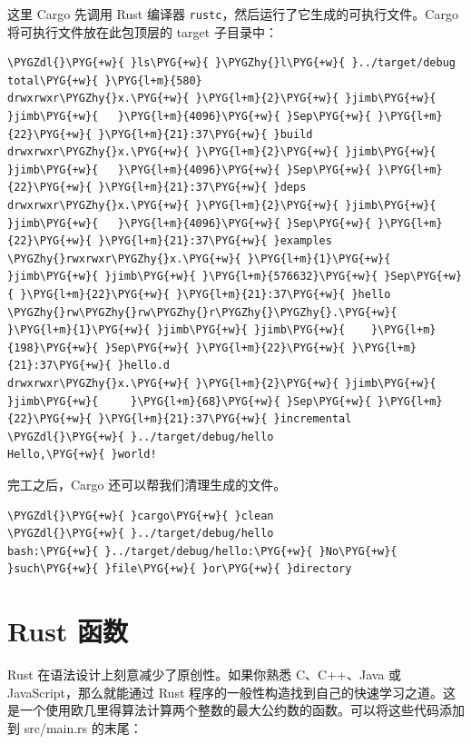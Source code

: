 这里 Cargo 先调用 Rust 编译器 \texttt{rustc}，然后运行了它生成的可执行文件。Cargo 将可执行文件放在此包顶层的 target 子目录中：

\begin{Verbatim}[commandchars=\\\{\},breaklines=true,breakanywhere=true,fontsize=\codefont,xleftmargin=17bp]
\PYGZdl{}\PYG{+w}{ }ls\PYG{+w}{ }\PYGZhy{}l\PYG{+w}{ }../target/debug
total\PYG{+w}{ }\PYG{l+m}{580}
drwxrwxr\PYGZhy{}x.\PYG{+w}{ }\PYG{l+m}{2}\PYG{+w}{ }jimb\PYG{+w}{ }jimb\PYG{+w}{   }\PYG{l+m}{4096}\PYG{+w}{ }Sep\PYG{+w}{ }\PYG{l+m}{22}\PYG{+w}{ }\PYG{l+m}{21}:37\PYG{+w}{ }build
drwxrwxr\PYGZhy{}x.\PYG{+w}{ }\PYG{l+m}{2}\PYG{+w}{ }jimb\PYG{+w}{ }jimb\PYG{+w}{   }\PYG{l+m}{4096}\PYG{+w}{ }Sep\PYG{+w}{ }\PYG{l+m}{22}\PYG{+w}{ }\PYG{l+m}{21}:37\PYG{+w}{ }deps
drwxrwxr\PYGZhy{}x.\PYG{+w}{ }\PYG{l+m}{2}\PYG{+w}{ }jimb\PYG{+w}{ }jimb\PYG{+w}{   }\PYG{l+m}{4096}\PYG{+w}{ }Sep\PYG{+w}{ }\PYG{l+m}{22}\PYG{+w}{ }\PYG{l+m}{21}:37\PYG{+w}{ }examples
\PYGZhy{}rwxrwxr\PYGZhy{}x.\PYG{+w}{ }\PYG{l+m}{1}\PYG{+w}{ }jimb\PYG{+w}{ }jimb\PYG{+w}{ }\PYG{l+m}{576632}\PYG{+w}{ }Sep\PYG{+w}{ }\PYG{l+m}{22}\PYG{+w}{ }\PYG{l+m}{21}:37\PYG{+w}{ }hello
\PYGZhy{}rw\PYGZhy{}rw\PYGZhy{}r\PYGZhy{}\PYGZhy{}.\PYG{+w}{ }\PYG{l+m}{1}\PYG{+w}{ }jimb\PYG{+w}{ }jimb\PYG{+w}{    }\PYG{l+m}{198}\PYG{+w}{ }Sep\PYG{+w}{ }\PYG{l+m}{22}\PYG{+w}{ }\PYG{l+m}{21}:37\PYG{+w}{ }hello.d
drwxrwxr\PYGZhy{}x.\PYG{+w}{ }\PYG{l+m}{2}\PYG{+w}{ }jimb\PYG{+w}{ }jimb\PYG{+w}{     }\PYG{l+m}{68}\PYG{+w}{ }Sep\PYG{+w}{ }\PYG{l+m}{22}\PYG{+w}{ }\PYG{l+m}{21}:37\PYG{+w}{ }incremental
\PYGZdl{}\PYG{+w}{ }../target/debug/hello
Hello,\PYG{+w}{ }world!
\end{Verbatim}

完工之后，Cargo 还可以帮我们清理生成的文件。

\begin{Verbatim}[commandchars=\\\{\},breaklines=true,breakanywhere=true,fontsize=\codefont,xleftmargin=17bp]
\PYGZdl{}\PYG{+w}{ }cargo\PYG{+w}{ }clean
\PYGZdl{}\PYG{+w}{ }../target/debug/hello
bash:\PYG{+w}{ }../target/debug/hello:\PYG{+w}{ }No\PYG{+w}{ }such\PYG{+w}{ }file\PYG{+w}{ }or\PYG{+w}{ }directory
\end{Verbatim}

\section{Rust 函数}

Rust 在语法设计上刻意减少了原创性。如果你熟悉 C、C++、Java 或 JavaScript，那么就能通过 Rust 程序的一般性构造找到自己的快速学习之道。这是一个使用欧几里得算法计算两个整数的最大公约数的函数。可以将这些代码添加到 src/main.rs 的末尾：

